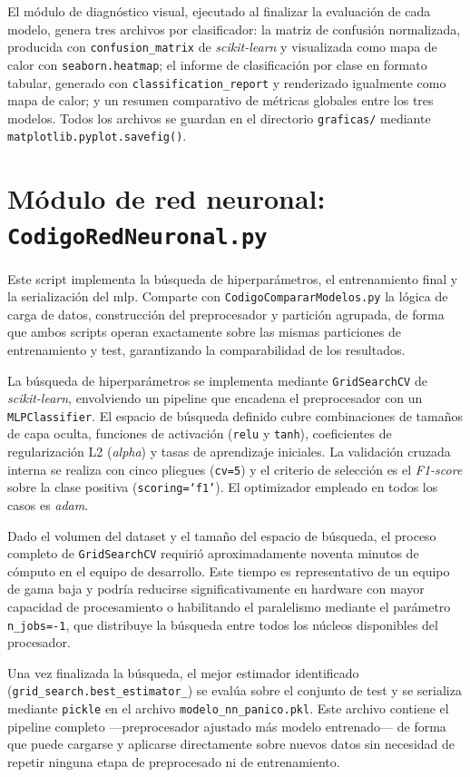 \documentclass[12pt]{report} %
\begin{document}
El módulo de diagnóstico visual, ejecutado al finalizar la evaluación de cada modelo, genera tres archivos por clasificador: la matriz de confusión normalizada, producida con \texttt{confusion\_matrix} de \textit{scikit-learn} y visualizada como mapa de calor con \texttt{seaborn.heatmap}; el informe de clasificación por clase en formato tabular, generado con \texttt{classification\_report} y renderizado igualmente como mapa de calor; y un resumen comparativo de métricas globales entre los tres modelos. Todos los archivos se guardan en el directorio \texttt{graficas/} mediante \texttt{matplotlib.pyplot.savefig()}.
 
\section{Módulo de red neuronal: \texttt{CodigoRedNeuronal.py}}
 
Este script implementa la búsqueda de hiperparámetros, el entrenamiento final y la serialización del \gls{mlp}. Comparte con \texttt{CodigoCompararModelos.py} la lógica de carga de datos, construcción del preprocesador y partición agrupada, de forma que ambos scripts operan exactamente sobre las mismas particiones de entrenamiento y test, garantizando la comparabilidad de los resultados.
 
La búsqueda de hiperparámetros se implementa mediante \texttt{GridSearchCV} de \textit{scikit-learn}, envolviendo un pipeline que encadena el preprocesador con un \texttt{MLPClassifier}. El espacio de búsqueda definido cubre combinaciones de tamaños de capa oculta, funciones de activación (\texttt{relu} y \texttt{tanh}), coeficientes de regularización L2 (\textit{alpha}) y tasas de aprendizaje iniciales. La validación cruzada interna se realiza con cinco pliegues (\texttt{cv=5}) y el criterio de selección es el \textit{F1-score} sobre la clase positiva (\texttt{scoring=`f1'}). El optimizador empleado en todos los casos es \textit{adam}.

Dado el volumen del dataset y el tamaño del espacio de búsqueda, el proceso completo de \texttt{GridSearchCV} requirió aproximadamente noventa minutos de cómputo en el equipo de desarrollo. Este tiempo es representativo de un equipo de gama baja y podría reducirse significativamente en hardware con mayor capacidad de procesamiento o habilitando el paralelismo mediante el parámetro \texttt{n\_jobs=-1}, que distribuye la búsqueda entre todos los núcleos disponibles del procesador.
 
Una vez finalizada la búsqueda, el mejor estimador identificado (\texttt{grid\_search.best\_estimator\_}) se evalúa sobre el conjunto de test y se serializa mediante \texttt{pickle} en el archivo \texttt{modelo\_nn\_panico.pkl}. Este archivo contiene el pipeline completo ---preprocesador ajustado más modelo entrenado--- de forma que puede cargarse y aplicarse directamente sobre nuevos datos sin necesidad de repetir ninguna etapa de preprocesado ni de entrenamiento.
 
\end{document}

